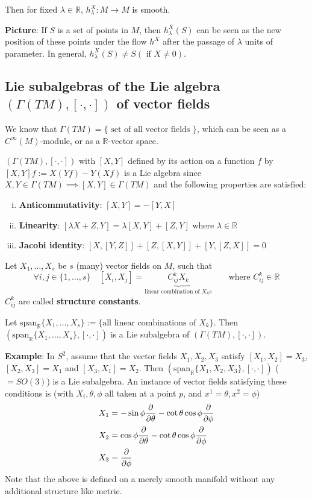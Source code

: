 Then for fixed $\lambda \in \mathbb{R}$, $h_{\lambda}^X : M \to M$ is smooth.

\textbf{Picture}: If $S$ is a set of points in $M$, then $h^X_{\lambda}(S)$ can be seen as the new position of these points under the flow $h^X$ after the passage of $\lambda$ units of parameter. In general, $h^X_{\lambda}(S) \neq S (\text{ if } X \neq 0)$.

\subsection{Lie subalgebras of the Lie algebra $(\Gamma(TM), [\cdot, \cdot])$ of vector fields}
We know that $\Gamma(TM) = \lbrace \text{ set of all vector fields } \rbrace$, which can be seen as a $C^{\infty}(M)$-module, or as a $\mathbb{R}$-vector space.

$(\Gamma(TM), [\cdot, \cdot])$ with $[X,Y]$ defined by its action on a function $f$ by $[X,Y] f := X(Yf) - Y(Xf)$ is a Lie algebra since $X,Y \in \Gamma(TM) \implies [X,Y] \in \Gamma(TM)$ and the following properties are satisfied:
\begin{enumerate}[(i)]
\item \textbf{Anticommutativity}: $[X,Y] = -[Y,X]$ 
\item \textbf{Linearity}: $[\lambda X + Z, Y] = \lambda [X,Y] + [Z,Y]$ where $\lambda \in \mathbb{R}$
\item \textbf{Jacobi identity}: $[X,[Y,Z]] + [Z,[X,Y]] + [Y,[Z,X]] = 0$ 
\end{enumerate}

Let $X_1, \dotsc, X_s$ be $s$ (many) vector fields on $M$, such that
\[
\forall i,j \in \lbrace 1,\dotsc,s \rbrace \quad [X_i,X_j] = \underbrace{C^k_{ij} X_k}_{\text{linear combination of }X_k s} \quad \quad \text{where } C^k_{ij} \in \mathbb{R}
\]
$C^k_{ij}$ are called \textbf{structure constants}.

Let $\text{span}_{\mathbb{R}} \lbrace X_1,\dotsc,X_s \rbrace := \lbrace \text{all linear combinations of }X_k \rbrace$. Then $\left(\text{span}_{\mathbb{R}} \lbrace X_1,\dotsc,X_s \rbrace, [\cdot, \cdot]\right)$ is a Lie subalgebra of $(\Gamma(TM), [\cdot, \cdot])$.

\textbf{Example}: In $S^2$, assume that the vector fields $X_1,X_2,X_3$ satisfy $[X_1,X_2] = X_3$, $[X_2,X_3] = X_1$ and $[X_3,X_1] = X_2$. Then $\left(\text{span}_{\mathbb{R}} \lbrace X_1,X_2,X_3 \rbrace, [\cdot, \cdot]\right)$ ($= SO(3)$) is a Lie subalgebra. An instance of vector fields satisfying these conditions is (with $X_i, \theta, \phi$ all taken at a point $p$, and $x^1 = \theta, x^2 = \phi$)
\begin{align*}
& X_1 = - \sin\phi \frac{\partial }{\partial \theta} - \cot\theta \cos\phi \frac{\partial }{\partial \phi} \\
& X_2 = \cos\phi \frac{\partial }{\partial \theta} - \cot\theta \cos\phi \frac{\partial }{\partial \phi} \\
& X_3 = \frac{\partial }{\partial \phi}
\end{align*}
Note that the above is defined on a merely smooth manifold without any additional structure like metric.

